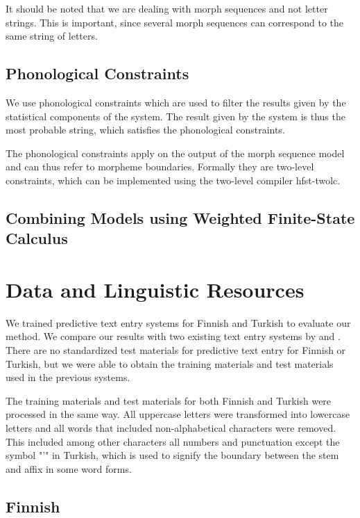 \documentclass{llncs}
\begin{document}
It should be noted that we are dealing with morph sequences and not
letter strings. This is important, since several morph sequences can
correspond to the same string of letters.

\subsection{Phonological Constraints}

We use phonological constraints which are used to filter the results
given by the statistical components of the system. The result given by
the system is thus the most probable string, which satisfies the
phonological constraints. 

The phonological constraints apply on the output of the morph sequence
model and can thus refer to morpheme boundaries. Formally they are
two-level constraints, which can be implemented using the two-level
compiler hfst-twolc.

\subsection{Combining Models using Weighted Finite-State Calculus}

\section{Data and Linguistic Resources}\label{data}

We trained predictive text entry systems for Finnish and Turkish to
evaluate our method. We compare our results with two existing text
entry systems by \cite{silfverberg/2011/cla} and
\cite{Tantug:2010}. There are no standardized test materials for
predictive text entry for Finnish or Turkish, but we were able to
obtain the training materials and test materials used in the previous
systems.

The training materials and test materials for both Finnish and Turkish
were processed in the same way. All uppercase letters were transformed
into lowercase letters and all words that included non-alphabetical
characters were removed. This included among other characters all
numbers and punctuation except the symbol "'" in Turkish, which is
used to signify the boundary between the stem and affix in some word
forms.

\subsection{Finnish}
\end{document}

